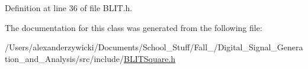 Definition at line 36 of file B\+L\+I\+T.\+h.



The documentation for this class was generated from the following file\+:\begin{DoxyCompactItemize}
\item 
/\+Users/alexanderzywicki/\+Documents/\+School\+\_\+\+Stuff/\+Fall\+\_/\+Digital\+\_\+\+Signal\+\_\+\+Generation\+\_\+and\+\_\+\+Analysis/src/include/\hyperlink{BLITSquare_8h}{B\+L\+I\+T\+Square.\+h}\end{DoxyCompactItemize}
